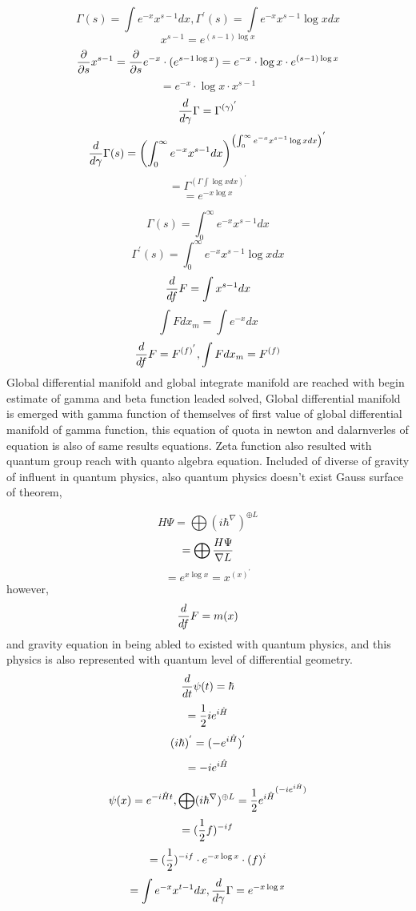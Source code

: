 \documentclass{jsarticle}
\begin{document}
    $$ \Gamma(s) = \int e^{-x} x^{s - 1}dx, \Gamma^{'}(s)
    = \int e^{-x} x^{s - 1}\log x dx $$
    $$ x^{s - 1} = e^{(s - 1)\log x} $$
    $$ {\partial \over \partial s}x^{s - 1} =
       {\partial \over \partial s}e^{-x}\cdot (e^{{s - 1}\log x}) 
       = e^{-x}\cdot \log x \cdot e^{(s - 1) \log x} $$
    $$ = e^{-x}\cdot \log x \cdot x^{s - 1} $$
    $$ {d \over d \gamma}\Gamma = \Gamma^{(\gamma)^{'}} $$
    $$ {d \over d \gamma}\Gamma(s) = \left( \int^{\infty}_{0}e^{-x}
    x^{s - 1}dx \right)^{\left(\int^{\infty}_{0}e^{-x}x^{s - 1}\log x dx
    \right)^{'}} $$
    $$ = \Gamma^{(\Gamma \int \log x dx)^{'}} $$
    $$ = e^{-x \log x} $$

    $$ \Gamma(s) = \int^{\infty}_{0} e^{-x}x^{s - 1}dx $$
    $$  \Gamma^{'}(s) = \int^{\infty}_{0} e^{-x}x^{s - 1} \log x dx $$
    $$ {d \over df}F = \int x^{s - 1}dx $$
    $$ \int F dx_m = \int e^{-x}dx $$
    $$ {d \over df}F = F^{(f)^{'}}, \int F dx_m = F^{(f)} $$
    Global differential manifold and global integrate manifold are
    reached with begin estimate of gamma and beta function leaded solved,
    Global differential manifold is emerged with gamma function of
    themselves of first value of global differential manifold of gamma
    function, this equation of quota in newton and dalarnverles of equation
    is also of same results equations. Zeta function also resulted with
    quantum group reach with quanto algebra equation.
        Included of diverse of gravity of influent in quantum physics,
    also quantum physics doesn't exist Gauss surface of theorem,
   
    $$ H \Psi = \bigoplus (i \hbar ^{\nabla})^{\oplus L} $$
    $$ = \bigoplus {{ H \Psi} \over \nabla L} $$
    $$ = e^{x \log x} = x^{(x)^{'}} $$
    however,
    $$ {d \over df}F = m(x) $$
    and gravity equation in being abled to existed with quantum physics,
    and this physics is also represented with quantum level of differential
    geometry.
    $$ {d \over dt}\psi(t) = \hbar $$
    $$ = {1 \over 2}i e^{i \Hat{H}} $$
    $$ (i \hbar)^{'} = (- e^{i \Hat{H}})^{'} $$
    $$ = - i e^{i \Hat{H}} $$
    $$ \psi(x) = e^{-i \Hat{H}t}, \bigoplus (i \hbar ^{\nabla})^{\oplus L} 
    = {{{1 \over 2} e^{i \Hat{H}}}^{(-i e^{i \Hat{H}})}} $$
    $$ = ({1 \over 2}f)^{-i f}$$
    $$ = ({1 \over 2})^{-i f} \cdot e^{-x \log x} \cdot (f)^{i} $$
    $$ = \int e^{- x} x^{t - 1}dx, {d \over d \gamma}\Gamma = e^{-x \log x}  $$
     
\end{document}
